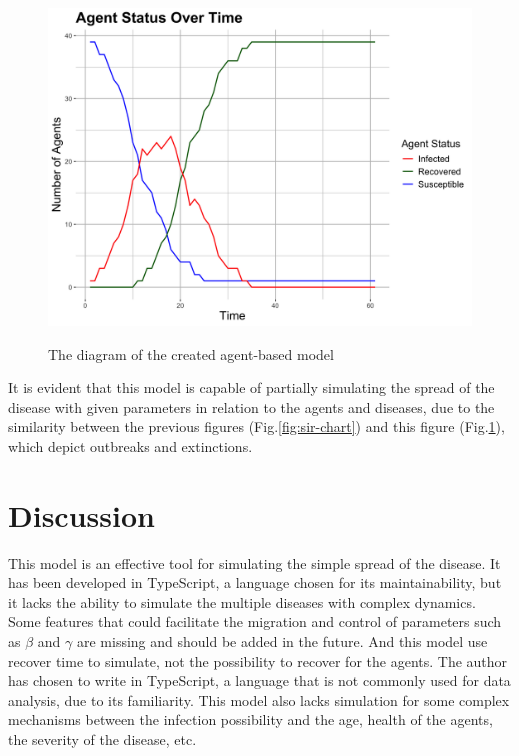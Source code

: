\documentclass[12pt]{article}
\begin{document}
\begin{figure}[ht]
	\centering
	\includegraphics[width=0.9\linewidth]{./assets/report-20246030-132911/diagram.png}
    \label{fig:agent-based-model-chart} 
	\caption{\scriptsize \sffamily The diagram of the created agent-based model}
\end{figure}

It is evident that this model is capable of partially simulating the spread of the disease with given parameters in relation to the agents and diseases, due to the similarity between the previous figures (Fig.\ref{fig:sir-chart}) and this figure (Fig.\ref{fig:agent-based-model-chart}), which depict outbreaks and extinctions.

\section{Discussion}
This model is an effective tool for simulating the simple spread of the disease. It has been developed in TypeScript, a language chosen for its maintainability, but it lacks the ability to simulate the multiple diseases with complex dynamics. Some features that could facilitate the migration and control of parameters such as $\beta$ and $\gamma$ are missing and should be added in the future. And this model use recover time to simulate, not the possibility to recover for the agents. The author has chosen to write in TypeScript, a language that is not commonly used for data analysis, due to its familiarity. This model also lacks simulation for some complex mechanisms between the infection possibility and the age, health of the agents, the severity of the disease, etc.

\end{document}

